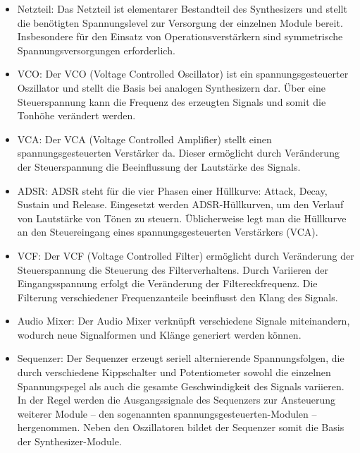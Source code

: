 \begin{itemize}
	\item Netzteil:\newline
	Das Netzteil ist elementarer Bestandteil des Synthesizers und stellt die benötigten Spannungslevel zur Versorgung der einzelnen Module bereit.
	Insbesondere für den Einsatz von Operationsverstärkern sind symmetrische Spannungsversorgungen erforderlich.
	
	\item VCO: \newline
	Der VCO (Voltage Controlled Oscillator) ist ein spannungsgesteuerter Oszillator und stellt die Basis bei analogen Synthesizern dar.
	Über eine Steuerspannung kann die Frequenz des erzeugten Signals und somit die Tonhöhe verändert werden. 
	\item VCA: \newline
	Der VCA (Voltage Controlled Amplifier) stellt einen spannungsgesteuerten Verstärker da. 
	Dieser ermöglicht durch Veränderung der Steuerspannung die Beeinflussung der Lautstärke des Signals.
	
	\item ADSR: \newline
	ADSR steht für die vier Phasen einer Hüllkurve: Attack, Decay, Sustain und Release. 
	Eingesetzt werden ADSR-Hüllkurven, um den Verlauf von Lautstärke von Tönen zu steuern. Üblicherweise legt man die Hüllkurve an den Steuereingang eines spannungsgesteuerten Verstärkers (VCA). 
	
	\item VCF: \newline
	Der VCF (Voltage Controlled Filter) ermöglicht durch Veränderung der Steuerspannung die Steuerung des Filterverhaltens.
	Durch Variieren der Eingangsspannung erfolgt die Veränderung der Filtereckfrequenz.
	Die Filterung verschiedener Frequenzanteile beeinflusst den Klang des Signals.
	
	\item Audio Mixer: \newline
	Der Audio Mixer verknüpft verschiedene Signale miteinandern, wodurch neue Signalformen und Klänge generiert werden können.
	
	\item Sequenzer: \newline
	Der Sequenzer erzeugt seriell alternierende Spannungsfolgen, die durch verschiedene Kippschalter und Potentiometer sowohl die einzelnen Spannungspegel als auch die gesamte Geschwindigkeit des Signals variieren. 
	In der Regel werden die Ausgangssignale des Sequenzers zur Ansteuerung weiterer Module – den sogenannten spannungsgesteuerten-Modulen – hergenommen. Neben den Oszillatoren bildet der Sequenzer somit die Basis der Synthesizer-Module.
	

\end{itemize}
